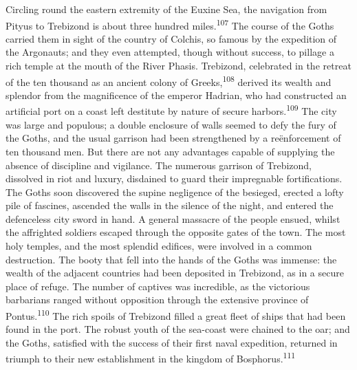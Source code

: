 
Circling round the eastern extremity of the Euxine Sea, the
navigation from Pityus to Trebizond is about three hundred miles.\textsuperscript{107}
The course of the Goths carried them in sight of the country
of Colchis, so famous by the expedition of the Argonauts; and
they even attempted, though without success, to pillage a rich
temple at the mouth of the River Phasis. Trebizond, celebrated in
the retreat of the ten thousand as an ancient colony of Greeks,\textsuperscript{108}
derived its wealth and splendor from the magnificence of the
emperor Hadrian, who had constructed an artificial port on a
coast left destitute by nature of secure harbors.\textsuperscript{109} The city
was large and populous; a double enclosure of walls seemed to
defy the fury of the Goths, and the usual garrison had been
strengthened by a reënforcement of ten thousand men. But there
are not any advantages capable of supplying the absence of
discipline and vigilance. The numerous garrison of Trebizond,
dissolved in riot and luxury, disdained to guard their
impregnable fortifications. The Goths soon discovered the supine
negligence of the besieged, erected a lofty pile of fascines,
ascended the walls in the silence of the night, and entered the
defenceless city sword in hand. A general massacre of the people
ensued, whilst the affrighted soldiers escaped through the
opposite gates of the town. The most holy temples, and the most
splendid edifices, were involved in a common destruction. The
booty that fell into the hands of the Goths was immense: the
wealth of the adjacent countries had been deposited in Trebizond,
as in a secure place of refuge. The number of captives was
incredible, as the victorious barbarians ranged without
opposition through the extensive province of Pontus.\textsuperscript{110} The rich
spoils of Trebizond filled a great fleet of ships that had been
found in the port. The robust youth of the sea-coast were chained
to the oar; and the Goths, satisfied with the success of their
first naval expedition, returned in triumph to their new
establishment in the kingdom of Bosphorus.\textsuperscript{111}



